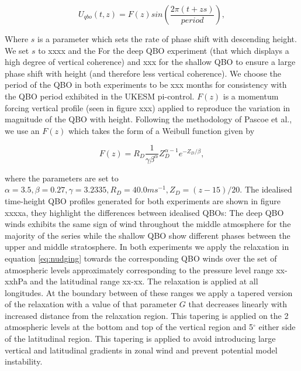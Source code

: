 \begin{equation} \label{eq:imposed_U}
U_{qbo}(t, z) = F(z) sin(\frac{2\pi (t + zs)}{period}),
\end{equation}

Where $s$ is a parameter which sets the rate of phase shift with descending height. We set $s$ to xxxx and the For the deep QBO experiment (that which displays a high degree of vertical coherence) and xxx for the shallow QBO to ensure a large phase shift with height (and therefore less vertical coherence). We choose the period of the QBO in both experiments to be xxx months for consistency with the QBO period exhibited in the UKESM pi-control. $F(z)$ is a momentum forcing vertical profile (seen in figure xxx) applied to reproduce the variation in magnitude of the QBO with height. Following the methodology of Pascoe et al., we use an $F(z)$ which takes the form of a Weibull function given by

\begin{equation} \label{eq:vertical_profile}
F(z) = R_D \frac{1}{\gamma \beta^\alpha}  Z_D^{\alpha-1}  e^{-Z_D/\beta},
\end{equation}

where the parameters are set to $\alpha = 3.5, \beta = 0.27, \gamma = 3.2335, R_D = 40.0 ms^{-1}, Z_{D} = (z - 15)/20$. The idealised time-height QBO profiles generated for both experiments are shown in figure xxxxa, they highlight the differences between idealised QBOs: The deep QBO winds exhibits the same sign of wind throughout the middle atmosphere for the majority of the series while the shallow QBO show different phases between the upper and middle stratosphere. In both experiments we apply the relaxation in equation \ref{eq:nudging} towards the corresponding QBO winds over the set of atmospheric levels approximately corresponding to the pressure level range xx-xxhPa and the latitudinal range xx-xx. The relaxation is applied at all longitudes. At the boundary between of these ranges we apply a tapered version of the relaxation with a value of that parameter $G$ that decreases linearly with increased distance from the relaxation region. This tapering is applied on the 2 atmospheric levels at the bottom and top of the vertical region and 5$^\circ$ either side of the latitudinal region. This tapering is applied to avoid introducing large vertical and latitudinal gradients in zonal wind and prevent potential model instability. 

